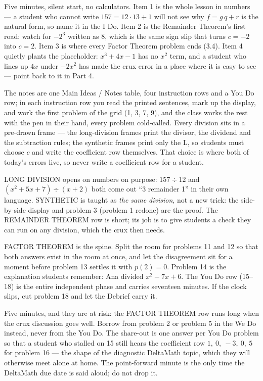 \documentclass[10pt]{article}
\begin{document}
\begin{teachernote}[Warm-Up]
Five minutes, silent start, no calculators. Item 1 is the whole lesson in numbers --- a
student who cannot write $157 = 12 \cdot 13 + 1$ will not see why $f = g\,q + r$ is the natural
form, so name it in the I Do. Item 2 is the Remainder Theorem's first road: watch for
$-2^3$ written as $8$, which is the same sign slip that turns $c = -2$ into $c = 2$. Item 3 is
where every Factor Theorem problem ends (3.4). Item 4 quietly plants the placeholder:
$x^3 + 4x - 1$ has no $x^2$ term, and a student who lines up $4x$ under $-2x^2$ has made the
crux error in a place where it is easy to see --- point back to it in Part 4.
\end{teachernote}

\begin{teachernote}
The notes are one Main Ideas / Notes table, four instruction rows and a You Do row; in each
instruction row you read the printed sentences, mark up the display, and work the first
problem of the grid (1, 3, 7, 9), and the class works the rest with the pen in their hand,
every problem cold-called. Every division sits in a pre-drawn frame --- the long-division
frames print the divisor, the dividend and the subtraction rules; the synthetic frames print
only the L, so students must choose $c$ and write the coefficient row themselves. That choice
is where both of today's errors live, so never write a coefficient row for a student.

LONG DIVISION opens on numbers on purpose: $157 \div 12$ and $(x^2 + 5x + 7) \div (x + 2)$ both
come out ``3 remainder 1'' in their own language. SYNTHETIC is taught as \emph{the same
division}, not a new trick: the side-by-side display and problem 3 (problem 1 redone) are the
proof. The REMAINDER THEOREM row is short; its job is to give students a check they can run on
any division, which the crux then needs.

FACTOR THEOREM is the spine. Split the room for problems 11 and 12 so that both answers
exist in the room at once, and let the disagreement sit for a moment before problem 13 settles
it with $p(2) = 0$. Problem 14 is the explanation students remember: Ana divided
$x^2 - 7x + 6$. The You Do row (15--18) is the entire independent phase and carries seventeen
minutes. If the clock slips, cut problem 18 and let the Debrief carry it.
\end{teachernote}

\begin{teachernote}[Debrief]
Five minutes, and they are at risk: the FACTOR THEOREM row runs long when the crux
discussion goes well. Borrow from problem 2 or problem 5 in the We Do instead, never from the
You Do. The share-out is one answer per You Do problem so that a student who stalled on 15
still hears the coefficient row $1,\ 0,\ -3,\ 0,\ 5$ for problem 16 --- the shape of the
diagnostic DeltaMath topic, which they will otherwise meet alone at home. The point-forward
minute is the only time the DeltaMath due date is said aloud; do not drop it.
\end{teachernote}
\end{document}
